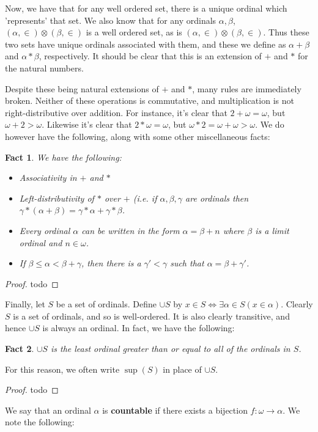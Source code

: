 \documentclass{article}
\theoremstyle{definition}
\theoremstyle{plain}
\theoremstyle{theorem}
\newtheorem{fact}{Fact}[section]
\begin{document}
Now, we have that for any well ordered set, there is a unique ordinal which 'represents' that set. We also know that for any ordinals $\alpha,\beta$, $(\alpha,\in) \otimes (\beta,\in)$ is a well ordered set, as is $(\alpha,\in) \otimes (\beta,\in)$. Thus these two sets have unique ordinals associated with them, and these we define as $\alpha + \beta$ and $\alpha * \beta$, respectively. It should be clear that this is an extension of $+$ and $*$ for the natural numbers. \par 
Despite these being natural extensions of $+$ and $*$, many rules are immediately broken. Neither of these operations is commutative, and multiplication is not right-distributive over addition. For instance, it's clear that $2+\omega = \omega$, but $\omega + 2 > \omega$. Likewise it's clear that $2*\omega=\omega$, but $\omega*2 = \omega + \omega > \omega$. We do however have the following, along with some other miscellaneous facts:
\begin{fact}
	We have the following:
	\begin{itemize}
		\item[(a)] Associativity in $+$ and $*$
		\item[(b)] Left-distributivity of $*$ over $+$ (i.e. if $\alpha,\beta,\gamma$ are ordinals then $\gamma * (\alpha + \beta) = \gamma * \alpha + \gamma * \beta$.
		\item[(c)] Every ordinal $\alpha$ can be written in the form $\alpha = \beta+n$ where $\beta$ is a limit ordinal and $n \in \omega$.
		\item[(d)] If $\beta \leq \alpha < \beta + \gamma$, then there is a $\gamma' < \gamma$ such that $\alpha = \beta+\gamma'$.  
	\end{itemize}
\end{fact}
\begin{proof}
	todo
\end{proof}
Finally, let $S$ be a set of ordinals. Define $\cup S$ by $x \in S \iff \exists \alpha \in S (x \in \alpha)$. Clearly $S$ is a set of ordinals, and so is well-ordered. It is also clearly transitive, and hence $\cup S$ is always an ordinal. In fact, we have the following:
\begin{fact}
	$\cup S$ is the least ordinal greater than or equal to all of the ordinals in $S$.
\end{fact} 
For this reason, we often write $\sup(S)$ in place of $\cup S$. 
\begin{proof}
	todo
\end{proof}
We say that an ordinal $\alpha$ is \textbf{countable} if there exists a bijection $f: \omega \to \alpha$. We note the following:
\end{document}
